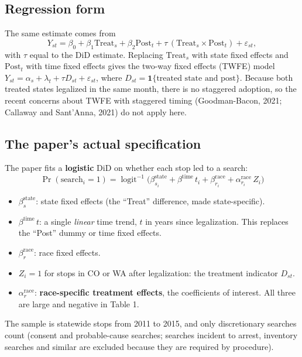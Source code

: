 \documentclass[11pt]{article}
\newcommand{\logit}{\operatorname{logit}}
\newcommand{\1}{\mathbf{1}}
\begin{document}
\subsection{Regression form}
The same estimate comes from
\[
Y_{st} = \beta_0 + \beta_1 \text{Treat}_s + \beta_2 \text{Post}_t + \tau\,(\text{Treat}_s \times \text{Post}_t) + \varepsilon_{st},
\]
with $\tau$ equal to the DiD estimate. Replacing $\text{Treat}_s$ with state fixed effects and $\text{Post}_t$ with time fixed effects gives the two-way fixed effects (TWFE) model $Y_{st} = \alpha_s + \lambda_t + \tau D_{st} + \varepsilon_{st}$, where $D_{st} = \1\{\text{treated state and post}\}$. Because both treated states legalized in the same month, there is no staggered adoption, so the recent concerns about TWFE with staggered timing (Goodman-Bacon, 2021; Callaway and Sant'Anna, 2021) do not apply here.

\subsection{The paper's actual specification}
The paper fits a \textbf{logistic} DiD on whether each stop led to a search:
\begin{equation}
\Pr(\text{search}_i = 1) = \logit^{-1}\Big(\beta^{\text{state}}_{s_i} + \beta^{\text{time}}\, t_i + \beta^{\text{race}}_{r_i} + \alpha^{\text{race}}_{r_i}\, Z_i\Big)
\label{eq:did}
\end{equation}
\begin{itemize}
  \item $\beta^{\text{state}}_s$: state fixed effects (the ``Treat'' difference, made state-specific).
  \item $\beta^{\text{time}}\, t$: a single \emph{linear} time trend, $t$ in years since legalization. This replaces the ``Post'' dummy or time fixed effects.
  \item $\beta^{\text{race}}_r$: race fixed effects.
  \item $Z_i = 1$ for stops in CO or WA after legalization: the treatment indicator $D_{st}$.
  \item $\alpha^{\text{race}}_r$: \textbf{race-specific treatment effects}, the coefficients of interest. All three are large and negative in Table 1.
\end{itemize}
The sample is statewide stops from 2011 to 2015, and only discretionary searches count (consent and probable-cause searches; searches incident to arrest, inventory searches and similar are excluded because they are required by procedure).
\end{document}
